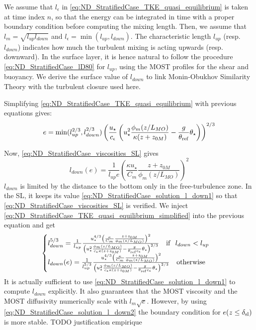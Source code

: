 We assume that $l_\epsilon$ in
\eqref{eq:ND_StratifiedCase_TKE_quasi_equilibrium} is taken at
time index $n$, so that the energy can be integrated in time
with a proper boundary condition before computing the mixing
length. Then, we assume that $l_m = \sqrt{l_{up}l_{down}}$ and
$l_\epsilon = \min(l_{up}, l_{down})$.
The characteristic length $l_{up}$ (resp. $l_{down}$) indicates
how much the turbulent mixing is acting upwards (resp. downward).
In the surface layer, it is hence natural to follow the
procedure \eqref{eq:ND_StratifiedCase_lD80} for $l_{up}$,
using the MOST profiles for the shear and buoyancy.
We derive the surface value of $l_{down}$ to link Monin-Obukhov
Similarity Theory with the turbulent closure used here.
\par
Simplifying \eqref{eq:ND_StratifiedCase_TKE_quasi_equilibrium}
with previous equations gives:
\begin{equation}
	\label{eq:ND_StratifiedCase_TKE_quasi_equilibrium_simplified}
	e = \min(l_{up}^{2/3}, l_{down}^{2/3})\left(
	\frac{u_\star}{c_\epsilon} 
	\left({u}_\star^2
	\frac{\phi_m(z/L_{MO})}{\kappa (z+z_{0M})}
	- \frac{g}{\theta_{\rm ref}}\theta_\star
	\right)
	\right)^{2/3}
\end{equation}

Now, \eqref{eq:ND_StratifiedCase_viscosities_SL} gives
\begin{equation}
	\label{eq:ND_StratifiedCase_solution_l_down1}
	l_{down}(e) = \frac{1}{l_{up} e} \left(
	\frac{\kappa u_\star}{C_m}
	\frac{z + z_{0M}}{\phi_m(z/L_{MO})}
\right)^2
\end{equation}
$l_{down}$ is limited by the distance to the bottom only
in the free-turbulence zone. In the SL, it keeps its value
\eqref{eq:ND_StratifiedCase_solution_l_down1}
so that \eqref{eq:ND_StratifiedCase_viscosities_SL} is
verified.
We inject \eqref{eq:ND_StratifiedCase_TKE_quasi_equilibrium_simplified}
into the previous equation and get
\begin{equation}
	\label{eq:ND_StratifiedCase_solution_l_down2}
	\begin{cases}
	l_{down}^{5/3} = \frac{1}{l_{up}} \frac{u_\star^{4/3}\left(
	\frac{\kappa}{C_m}
	\frac{z + z_{0M}}{\phi_m(z/L_{MO})}
	\right)^2}{
	\left({u}_\star^2
	\frac{\phi_m(z/L_{MO})}{c_\epsilon\kappa (z+z_{0M})}
	- \frac{g}{\theta_{\rm ref}c_\epsilon}\theta_\star
	\right)^{2/3}} ~~~ {\rm if } ~~l_{down} < l_{up}\\
	l_{down}(e) = \frac{1}{l_{up}^{5/3}} \frac{u_\star^{4/3}\left(
	\frac{\kappa}{C_m}
	\frac{z + z_{0M}}{\phi_m(z/L_{MO})}
	\right)^2}{
	\left({u}_\star^2
	\frac{\phi_m(z/L_{MO})}{c_\epsilon\kappa (z+z_{0M})}
	- \frac{g}{\theta_{\rm ref}c_\epsilon}\theta_\star
	\right)^{2/3}} ~~~ {\rm otherwise}\\
	\end{cases}
\end{equation}
It is actually sufficient to use
\eqref{eq:ND_StratifiedCase_solution_l_down1}
to compute $l_{down}$ explicitly. It also guarantees that
the MOST viscosity and the MOST diffusivity numerically
scale with $l_m\sqrt{e}$.
However, by using \eqref{eq:ND_StratifiedCase_solution_l_down2}
the boundary condition for $e(z \leq \delta_{\rm sl})$ is more
stable. {\color{red} TODO justification empirique}
